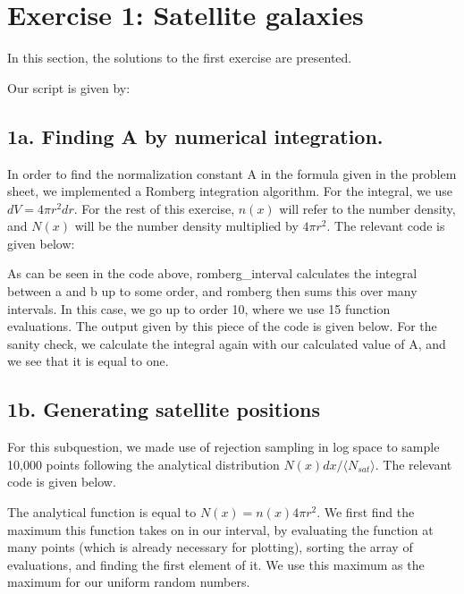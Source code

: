 \section{Exercise 1: Satellite galaxies}

In this section, the solutions to the first exercise are presented. 

Our script is given by:


\subsection{1a. Finding A by numerical integration.}
In order to find the normalization constant A in the formula given in the problem sheet, we implemented a Romberg integration algorithm. For the integral, we use $dV = 4\pi r^2 dr$. For the rest of this exercise, $n(x)$ will refer to the number density, and $N(x)$ will be the number density multiplied by $ 4\pi r^2$. The relevant code is given below:



As can be seen in the code above, romberg\_interval calculates the integral between a and b up to some order, and romberg then sums this over many intervals. In this case, we go up to order 10, where we use 15 function evaluations. The output given by this piece of the code is given below. For the sanity check, we calculate the integral again with our calculated value of A, and we see that it is equal to one.



\subsection{1b. Generating satellite positions}
For this subquestion, we made use of rejection sampling in log space to sample 10,000 points following the analytical distribution $N(x)dx / \langle N_{sat} \rangle$. The relevant code is given below.



The analytical function is equal to $N(x) = n(x) 4\pi r^2$. We first find the maximum this function takes on in our interval, by evaluating the function at many points (which is already necessary for plotting), sorting the array of evaluations, and finding the first element of it. We use this maximum as the maximum for our uniform random numbers.

